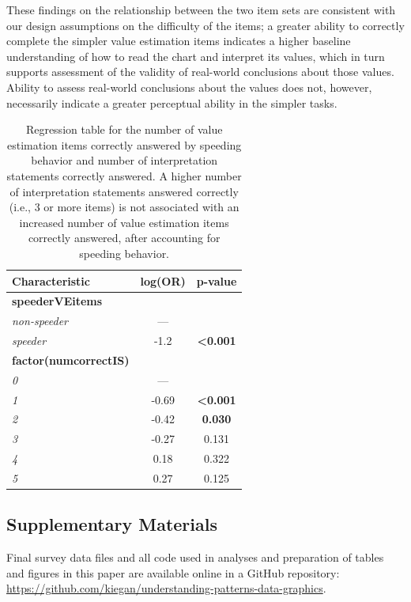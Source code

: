 \documentclass{IEEEcsmag}
\begin{document}
These findings on the relationship between the two item sets are consistent with our design assumptions on the difficulty of the items; a greater ability to correctly complete the simpler value estimation items indicates a higher baseline understanding of how to read the chart and interpret its values, which in turn supports assessment of the validity of real-world conclusions about those values. Ability to assess real-world conclusions about the values does not, however, necessarily indicate a greater perceptual ability in the simpler tasks.

\begin{table}

\caption{Regression table for the number of value estimation items correctly answered by speeding behavior and number of interpretation statements correctly answered. A higher number of interpretation statements answered correctly (i.e., 3 or more items) is not associated with an increased number of value estimation items correctly answered, after accounting for speeding behavior. }


\begin{tabular}{lcc}
\toprule
\textbf{Characteristic} & \textbf{log(OR)} & \textbf{p-value}\\
\midrule
\textbf{speederVEitems} &  & \\
\textit{non-speeder} & — & \\
\textit{speeder} & -1.2 & \textbf{<0.001}\\
\textbf{factor(numcorrectIS)} &  & \\
\textit{0} & — & \\\textit{1} & -0.69 & \textbf{<0.001}\\
\textit{2} & -0.42 & \textbf{0.030}\\
\textit{3} & -0.27 & 0.131\\
\textit{4} & 0.18 & 0.322\\
\textit{5} & 0.27 & 0.125\\
\bottomrule
\end{tabular}


\end{table}

\subsection{Supplementary Materials}\label{supplementary-materials}

Final survey data files and all code used in analyses and preparation of tables and figures in this paper are available online in a GitHub repository: \url{https://github.com/kiegan/understanding-patterns-data-graphics}.
\end{document}
